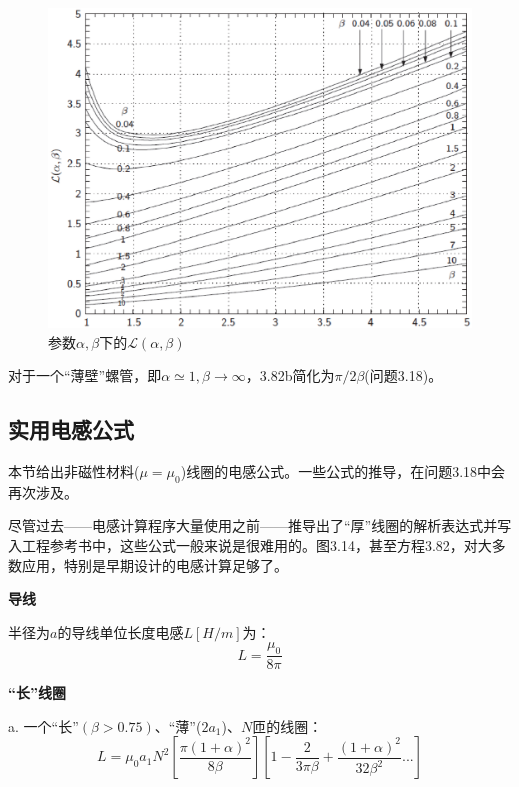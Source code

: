 \begin{figure}[htbp]
  \centering
 \includegraphics[scale=0.5]{chpt3/figs/fig3.14.eps}
  \caption{参数$\alpha,\beta$下的$\mathcal{L}(\alpha,\beta)$}
\end{figure}

对于一个“薄壁”螺管，即$\alpha\simeq 1,\beta\rightarrow \infty$，3.82b简化为$\pi/2\beta$(问题3.18)。

\subsection{实用电感公式}
本节给出非磁性材料($\mu=\mu_0$)线圈的电感公式。一些公式的推导，在问题3.18中会再次涉及。

尽管过去——电感计算程序大量使用之前——推导出了“厚”线圈的解析表达式并写入工程参考书中，这些公式一般来说是很难用的。图3.14，甚至方程3.82，对大多数应用，特别是早期设计的电感计算足够了。


\textbf{导线}  
  
  半径为$a$的导线单位长度电感$L[H/m]$为：
  \begin{equation}
         L=\frac{\mu_0}{8\pi}%
  \end{equation}
  
\textbf{“长”线圈} 
  
  a. 一个“长”$(β>0.75)$、“薄”($2a_1$)、$N$匝的线圈：
\begin{equation}
  L=\mu_0a_1N^2\left[\frac{\pi(1+\alpha)^2}{8\beta}\right]\left[1-\frac{2}{3\pi\beta}+\frac{(1+\alpha)^2}{32\beta^2}...\right]%
\end{equation}

